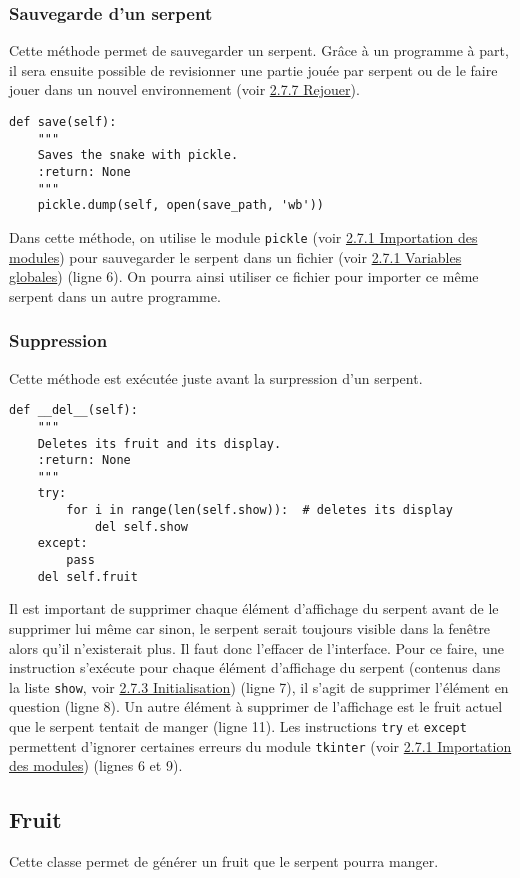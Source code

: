 \documentclass[12pt, a4paper, openany]{book}
\begin{document}
\subsubsection{Sauvegarde d'un serpent}
\label{r:2.7.3-sau}
Cette méthode permet de sauvegarder un serpent. Grâce à un programme à part, il sera ensuite possible de revisionner une partie jouée par serpent ou de le faire jouer dans un nouvel environnement (voir \hyperref[r:2.7.7]{2.7.7 Rejouer}).
\begin{verbatim}
def save(self):
    """
    Saves the snake with pickle.
    :return: None
    """
    pickle.dump(self, open(save_path, 'wb'))
\end{verbatim}
Dans cette méthode, on utilise le module \verb'pickle' (voir \hyperref[r:2.7.1-imp]{2.7.1 Importation des modules}) pour sauvegarder le serpent dans un fichier (voir \hyperref[r:2.7.1-var]{2.7.1 Variables globales}) (ligne 6). On pourra ainsi utiliser ce fichier pour importer ce même serpent dans un autre programme.

\subsubsection{Suppression}
Cette méthode est exécutée juste avant la surpression d'un serpent.
\begin{verbatim}
def __del__(self):
    """
    Deletes its fruit and its display.
    :return: None
    """
    try:
        for i in range(len(self.show)):  # deletes its display
            del self.show
    except:
        pass
    del self.fruit
\end{verbatim}
Il est important de supprimer chaque élément d'affichage du serpent avant de le supprimer lui même car sinon, le serpent serait toujours visible dans la fenêtre alors qu'il n'existerait plus. Il faut donc l'effacer de l'interface. Pour ce faire, une instruction s'exécute pour chaque élément d'affichage du serpent (contenus dans la liste \verb'show', voir \hyperref[r:2.7.3-ini]{2.7.3 Initialisation}) (ligne 7), il s'agit de supprimer l'élément en question (ligne 8).\newline
Un autre élément à supprimer de l'affichage est le fruit actuel que le serpent tentait de \og{}manger\fg{} (ligne 11).\newline
Les instructions \verb'try' et \verb'except' permettent d’ignorer certaines erreurs du module \verb'tkinter' (voir \hyperref[r:2.7.1-imp]{2.7.1 Importation des modules}) (lignes 6 et 9).

\subsection{Fruit}
Cette classe permet de générer un fruit que le serpent pourra manger.
\end{document}
